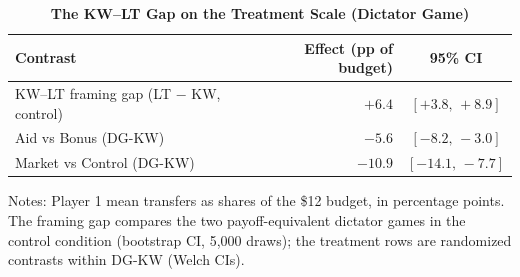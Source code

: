 \begin{table}[!htbp]
\centering
\small
\renewcommand{\arraystretch}{1.15}
\caption{\textbf{The KW--LT Gap on the Treatment Scale (Dictator Game)}}
\label{tab:kwlt_treatment_scale}
\begin{tabular}{l rc}
\toprule
Contrast & Effect (pp of budget) & 95\% CI \\
\midrule
KW--LT framing gap (LT $-$ KW, control) & $+6.4$ & $[+3.8,\,+8.9]$ \\
Aid vs Bonus (DG-KW) & $-5.6$ & $[-8.2,\,-3.0]$ \\
Market vs Control (DG-KW) & $-10.9$ & $[-14.1,\,-7.7]$ \\
\bottomrule
\end{tabular}
\begin{flushleft}
\footnotesize Notes: Player 1 mean transfers as shares of the \$12 budget, in percentage points. The framing gap compares the two payoff-equivalent dictator games in the control condition (bootstrap CI, 5{,}000 draws); the treatment rows are randomized contrasts within DG-KW (Welch CIs).
\end{flushleft}
\end{table}

